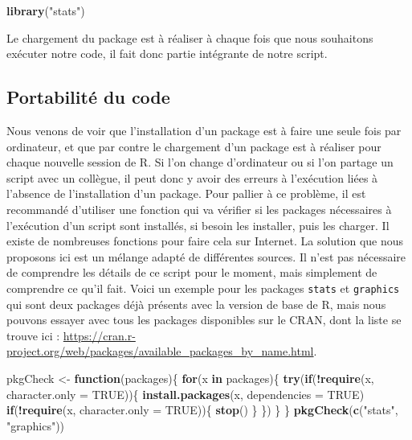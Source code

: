 \documentclass[
]{book}
\newenvironment{Shaded}{\begin{snugshade}}{\end{snugshade}}
\newcommand{\ControlFlowTok}[1]{\textcolor[rgb]{0.13,0.29,0.53}{\textbf{#1}}}
\newcommand{\DataTypeTok}[1]{\textcolor[rgb]{0.13,0.29,0.53}{#1}}
\newcommand{\KeywordTok}[1]{\textcolor[rgb]{0.13,0.29,0.53}{\textbf{#1}}}
\newcommand{\NormalTok}[1]{#1}
\newcommand{\OperatorTok}[1]{\textcolor[rgb]{0.81,0.36,0.00}{\textbf{#1}}}
\newcommand{\OtherTok}[1]{\textcolor[rgb]{0.56,0.35,0.01}{#1}}
\newcommand{\StringTok}[1]{\textcolor[rgb]{0.31,0.60,0.02}{#1}}
\begin{document}
\begin{Shaded}
\begin{Highlighting}[]
\KeywordTok{library}\NormalTok{(}\StringTok{"stats"}\NormalTok{)}
\end{Highlighting}
\end{Shaded}

Le chargement du package est à réaliser à chaque fois que nous souhaitons exécuter notre code, il fait donc partie intégrante de notre script.

\hypertarget{portabilituxe9-du-code}{%
\subsection{Portabilité du code}\label{portabilituxe9-du-code}}

Nous venons de voir que l'installation d'un package est à faire une seule fois par ordinateur, et que par contre le chargement d'un package est à réaliser pour chaque nouvelle session de R. Si l'on change d'ordinateur ou si l'on partage un script avec un collègue, il peut donc y avoir des erreurs à l'exécution liées à l'absence de l'installation d'un package. Pour pallier à ce problème, il est recommandé d'utiliser une fonction qui va vérifier si les packages nécessaires à l'exécution d'un script sont installés, si besoin les installer, puis les charger. Il existe de nombreuses fonctions pour faire cela sur Internet. La solution que nous proposons ici est un mélange adapté de différentes sources. Il n'est pas nécessaire de comprendre les détails de ce script pour le moment, mais simplement de comprendre ce qu'il fait. Voici un exemple pour les packages \texttt{stats} et \texttt{graphics} qui sont deux packages déjà présents avec la version de base de R, mais nous pouvons essayer avec tous les packages disponibles sur le CRAN, dont la liste se trouve ici : \url{https://cran.r-project.org/web/packages/available_packages_by_name.html}.

\begin{Shaded}
\begin{Highlighting}[]
\NormalTok{pkgCheck <-}\StringTok{ }\ControlFlowTok{function}\NormalTok{(packages)\{}
    \ControlFlowTok{for}\NormalTok{(x }\ControlFlowTok{in}\NormalTok{ packages)\{}
        \KeywordTok{try}\NormalTok{(}\ControlFlowTok{if}\NormalTok{(}\OperatorTok{!}\KeywordTok{require}\NormalTok{(x, }\DataTypeTok{character.only =} \OtherTok{TRUE}\NormalTok{))\{}
            \KeywordTok{install.packages}\NormalTok{(x, }\DataTypeTok{dependencies =} \OtherTok{TRUE}\NormalTok{)}
            \ControlFlowTok{if}\NormalTok{(}\OperatorTok{!}\KeywordTok{require}\NormalTok{(x, }\DataTypeTok{character.only =} \OtherTok{TRUE}\NormalTok{))\{}
                \KeywordTok{stop}\NormalTok{()}
\NormalTok{            \}}
\NormalTok{        \})}
\NormalTok{    \}}
\NormalTok{\}}
\KeywordTok{pkgCheck}\NormalTok{(}\KeywordTok{c}\NormalTok{(}\StringTok{"stats"}\NormalTok{, }\StringTok{"graphics"}\NormalTok{))}
\end{Highlighting}
\end{Shaded}
\end{document}
